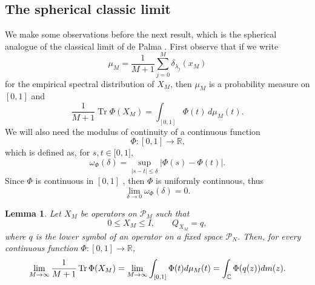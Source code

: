 \documentclass[12pt]{amsart}
\theoremstyle{plain}
\newtheorem{lemma}[theorem]{Lemma}
\theoremstyle{definition}
\theoremstyle{remark}
\numberwithin{equation}{section}
\newcommand{\func}[1]{\operatorname{#1}}
\newcommand{\1}{\mathbf 1}
\begin{document}
\subsection{The spherical classic limit}

We make some observations before the next result, which is the spherical
analogue of the classical limit of de Palma \cite{DePalma2018}. First
observe that if we write%
\begin{equation*}
\mu _{M}=\frac{1}{M+1}\sum\limits_{j=0}^{M}\delta _{\lambda _{j}}(x_{M})
\end{equation*}%
for the empirical spectral distribution of $X_{M}$, then $\mu _{M}$ is a
probability measure on $[0,1]$ and 
\begin{equation*}
\frac{1}{M+1}\func{Tr}\Phi (X_{M})=\int_{[0,1]}\Phi (t)\,d\mu _{M}(t)\text{.}
\end{equation*}%
We will also need the modulus of continuity of a continuous function%
\begin{equation*}
\Phi :[0,1]\rightarrow \mathbb{R}\text{,}
\end{equation*}%
which is defined as, for $s,t\in \lbrack 0,1]$, 
\begin{equation*}
\omega _{\Phi }(\delta )=\sup_{\left\vert s-t\right\vert \leq \delta
}\left\vert \Phi (s)-\Phi (t)\right\vert \text{.}
\end{equation*}%
Since $\Phi $ is continuous in $[0,1]$ , then $\Phi $ is uniformly
continuous, thus%
\begin{equation*}
\lim_{\delta \rightarrow 0}\omega _{\Phi }(\delta )=0\text{.}
\end{equation*}

\begin{lemma}
\label{lem:classical} Let $X_{M}$ be operators on $\mathcal{P}_{M}$ such
that 
\begin{equation*}
0\leq X_{M}\leq I,\qquad Q_{X_{M}}=q,
\end{equation*}%
where $q$ is the lower symbol of an operator on a fixed space $\mathcal{P}%
_{N}$. Then, for every continuous function $\Phi :[0,1]\rightarrow \mathbb{R}
$, 
\begin{equation}
\lim_{M\rightarrow \infty }\frac{1}{M+1}\func{Tr}\Phi
(X_{M})=\lim_{M\rightarrow \infty }\int_{[0,1]}\Phi (t)d\mu _{M}(t)=\int_{%
\mathbb{C}}\Phi (q(z))dm(z).  \label{eq:classicalconv}
\end{equation}
\end{lemma}
\end{document}
